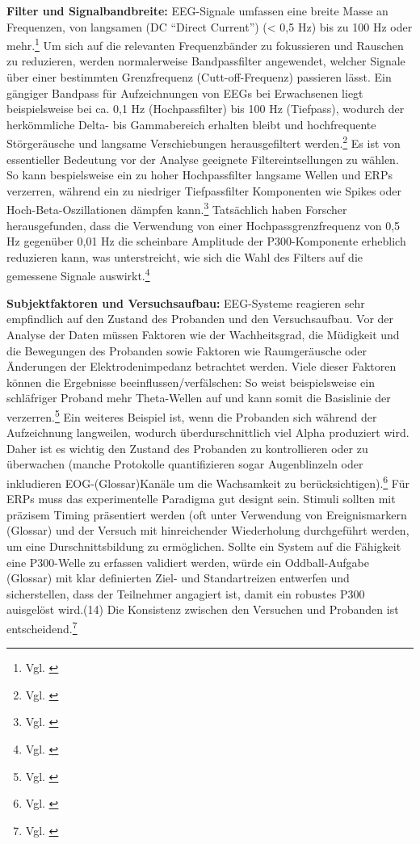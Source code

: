 \textbf{Filter und Signalbandbreite:} EEG-Signale umfassen eine breite Masse an Frequenzen, von langsamen (DC “Direct Current”) (< 0,5 Hz) bis zu 100 Hz oder mehr.\footnote{Vgl. \cite{wikipedia_eeg_highpass}}  Um sich auf die relevanten Frequenzbänder zu fokussieren und Rauschen zu reduzieren, werden normalerweise Bandpassfilter angewendet, welcher Signale über einer bestimmten Grenzfrequenz (Cutt-off-Frequenz) passieren lässt. Ein gängiger Bandpass für Aufzeichnungen von EEGs bei Erwachsenen liegt beispielsweise bei ca.  0,1 Hz (Hochpassfilter) bis 100 Hz (Tiefpass), wodurch  der herkömmliche Delta- bis Gammabereich erhalten bleibt und hochfrequente Störgeräusche und langsame Verschiebungen herausgefiltert werden.\footnote{Vgl. \cite{wikipedia_eeg_highpass}}  Es ist von essentieller Bedeutung vor der Analyse geeignete Filtereintsellungen zu wählen. So kann bespielsweise ein zu hoher Hochpassfilter langsame Wellen und ERPs verzerren, während ein zu niedriger Tiefpassfilter Komponenten wie Spikes oder Hoch-Beta-Oszillationen dämpfen kann.\footnote{Vgl. \cite{acns_guideline2}} Tatsächlich haben Forscher herausgefunden, dass die Verwendung von einer Hochpassgrenzfrequenz von 0,5 Hz gegenüber 0,01 Hz die scheinbare Amplitude der P300-Komponente erheblich reduzieren kann, was unterstreicht, wie sich die Wahl des Filters auf die gemessene Signale auswirkt.\footnote{Vgl. \cite{acns_guideline2}}   

\textbf{Subjektfaktoren und Versuchsaufbau:} EEG-Systeme reagieren sehr empfindlich auf den Zustand des Probanden und den Versuchsaufbau. Vor der Analyse der Daten müssen Faktoren wie der Wachheitsgrad, die Müdigkeit und die Bewegungen des Probanden sowie Faktoren wie Raumgeräusche oder Änderungen der Elektrodenimpedanz betrachtet werden. Viele dieser Faktoren können die Ergebnisse beeinflussen/verfälschen: So weist beispielsweise ein schläfriger Proband mehr Theta-Wellen auf und kann somit die Basislinie der  verzerren.\footnote{Vgl. \cite{nayak_waveforms}} Ein weiteres Beispiel ist, wenn die Probanden sich während der Aufzeichnung langweilen, wodurch überdurschnittlich viel Alpha produziert wird. Daher ist es wichtig den Zustand des Probanden zu kontrollieren oder zu überwachen (manche Protokolle quantifizieren sogar Augenblinzeln oder inkludieren EOG-(Glossar)Kanäle um die Wachsamkeit zu berücksichtigen).\footnote{Vgl. \cite{nayak_waveforms}} Für ERPs muss das experimentelle Paradigma gut designt sein. Stimuli sollten mit präzisem Timing präsentiert werden (oft unter Verwendung von Ereignismarkern (Glossar) und der Versuch mit hinreichender Wiederholung durchgeführt werden, um eine Durschnittsbildung zu ermöglichen. Sollte ein System auf die Fähigkeit eine P300-Welle zu erfassen validiert werden, würde ein Oddball-Aufgabe (Glossar) mit klar definierten Ziel- und Standartreizen entwerfen und sicherstellen, dass der Teilnehmer angagiert ist, damit ein robustes P300 auisgelöst wird.(14) Die Konsistenz zwischen den Versuchen und Probanden ist entscheidend.\footnote{Vgl. \cite{acns_guideline2}} 


